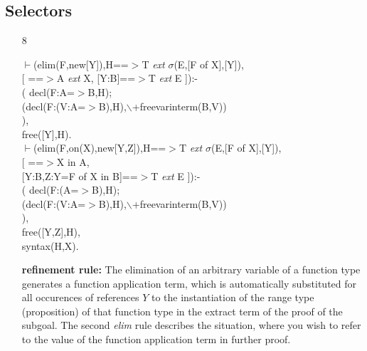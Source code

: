 \documentclass[11pt]{report}
\begin{document}
 \subsection{Selectors}
 \begin{enumerate}
 \item[8]
\begin{sf}\begin{tabbing}
$\vdash$(elim(F,new[Y]),H==$>$T \mbox{\it ext} $\sigma$(E,[F of X],[Y]), \\[-0.15ex]
\hspace{2em}[ ==$>$A \mbox{\it ext} X, [Y:B]==$>$T \mbox{\it ext} E ]):-\\[-0.15ex]
\hspace{2em}( decl(F:A=$>$B,H);\\[-0.15ex]
\hspace{3em}(decl(F:(V:A=$>$B),H),$\backslash$+freevarinterm(B,V))\\[-0.15ex]
\hspace{2em}),\\[-0.15ex]
\hspace{2em}free([Y],H).\\[-0.15ex]
$\vdash$(elim(F,on(X),new[Y,Z]),H==$>$T \mbox{\it ext} $\sigma$(E,[F of X],[Y]),\\[-0.15ex]
\hspace{2em}[ ==$>$X in A, \\[-0.15ex]
\hspace{3em}[Y:B,Z:Y=F of X in B]==$>$T \mbox{\it ext} E ]):-\\[-0.15ex]
\hspace{2em}( decl(F:(A=$>$B),H);\\[-0.15ex]
\hspace{3em}(decl(F:(V:A=$>$B),H),$\backslash$+freevarinterm(B,V))\\[-0.15ex]
\hspace{2em}),\\[-0.15ex]
\hspace{2em}free([Y,Z],H),\\[-0.15ex]
\hspace{2em}syntax(H,X).
\end{tabbing}\end{sf}

 {\bf refinement rule:}
 The elimination of an arbitrary variable of a function type 
 generates a function application term, which is automatically
 substituted for all occurences of references $Y$ to the 
 instantiation of the range type (proposition) of that function
 type in the extract term of the proof of the subgoal.
 The second \emph{elim} rule describes the situation, where you
 wish to refer to the value of the function application term
 in further proof. 
  

\end{enumerate}
\end{document}

